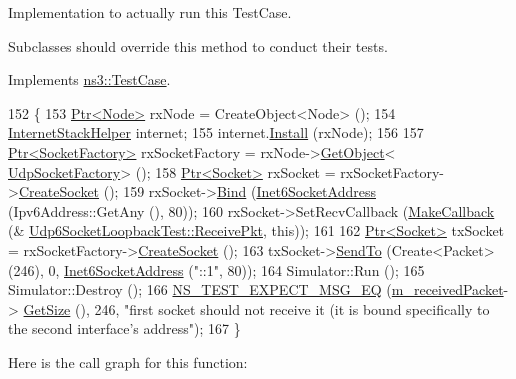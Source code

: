 Implementation to actually run this Test\+Case. 

Subclasses should override this method to conduct their tests. 

Implements \hyperlink{classns3_1_1TestCase_a8ff74680cf017ed42011e4be51917a24}{ns3\+::\+Test\+Case}.


\begin{DoxyCode}
152 \{
153   \hyperlink{classns3_1_1Ptr}{Ptr<Node>} rxNode = CreateObject<Node> ();
154   \hyperlink{classns3_1_1InternetStackHelper}{InternetStackHelper} internet;
155   internet.\hyperlink{classns3_1_1InternetStackHelper_a6645b412f31283d2d9bc3d8a95cebbc0}{Install} (rxNode);
156 
157   \hyperlink{classns3_1_1Ptr}{Ptr<SocketFactory>} rxSocketFactory = rxNode->\hyperlink{classns3_1_1Object_a13e18c00017096c8381eb651d5bd0783}{GetObject}<
      \hyperlink{classns3_1_1UdpSocketFactory}{UdpSocketFactory}> ();
158   \hyperlink{classns3_1_1Ptr}{Ptr<Socket>} rxSocket = rxSocketFactory->\hyperlink{classns3_1_1SocketFactory_a97351e6e7860503a4912042530449f62}{CreateSocket} ();
159   rxSocket->\hyperlink{classns3_1_1Socket_ada93439a43de2028b5a8fc6621dad482}{Bind} (\hyperlink{classns3_1_1Inet6SocketAddress}{Inet6SocketAddress} (Ipv6Address::GetAny (), 80));
160   rxSocket->SetRecvCallback (\hyperlink{group__makecallbackmemptr_ga9376283685aa99d204048d6a4b7610a4}{MakeCallback} (&
      \hyperlink{classUdp6SocketLoopbackTest_a5bcb3750d6e5e37f16ca0792554ad15a}{Udp6SocketLoopbackTest::ReceivePkt}, \textcolor{keyword}{this}));
161 
162   \hyperlink{classns3_1_1Ptr}{Ptr<Socket>} txSocket = rxSocketFactory->\hyperlink{classns3_1_1SocketFactory_a97351e6e7860503a4912042530449f62}{CreateSocket} ();
163   txSocket->\hyperlink{classns3_1_1Socket_af898fce6a58e0dbba23c1c6de1d4220e}{SendTo} (Create<Packet> (246), 0, \hyperlink{classns3_1_1Inet6SocketAddress}{Inet6SocketAddress} (\textcolor{stringliteral}{"::1"}, 80));
164   Simulator::Run ();
165   Simulator::Destroy ();
166   \hyperlink{group__testing_ga7304ba46a28d8cf08dfdfd6499cf7068}{NS\_TEST\_EXPECT\_MSG\_EQ} (\hyperlink{classUdp6SocketLoopbackTest_a9affdeec8230cec75b8315a0ce0def49}{m\_receivedPacket}->
      \hyperlink{classns3_1_1Packet_a462855c9929954d4301a4edfe55f4f1c}{GetSize} (), 246, \textcolor{stringliteral}{"first socket should not receive it (it is bound specifically to the second
       interface's address"});
167 \}
\end{DoxyCode}


Here is the call graph for this function\+:


